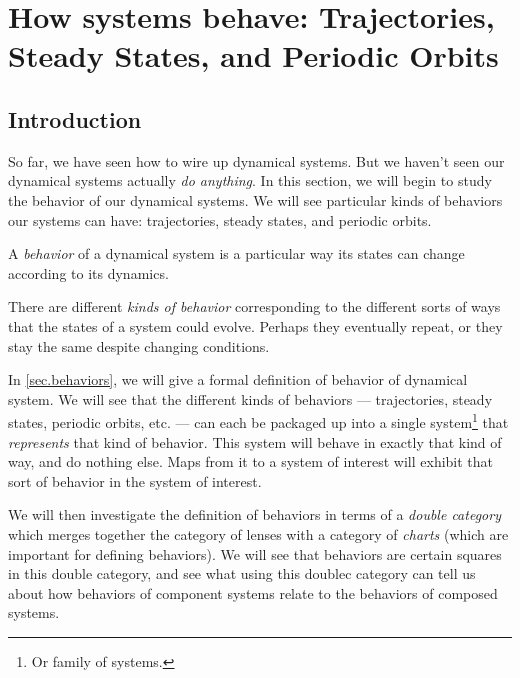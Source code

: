 \documentclass[DynamicalBook]{subfiles}
\begin{document}
%


\setcounter{chapter}{1}%


\chapter{How systems behave: Trajectories, Steady States, and Periodic Orbits}\label{chapter.2}

\section{Introduction}

So far, we have seen how to wire up dynamical systems. But we haven't seen our
dynamical systems actually \emph{do anything}. In this section, we will begin to
study the behavior of our dynamical systems. We will see particular kinds of
behaviors our systems can have:
trajectories, steady states, and periodic orbits.

\begin{informal}
  A \emph{behavior} of a dynamical system is a particular way its states can
  change according to its dynamics.  

  There are different \emph{kinds of behavior} corresponding to the different
  sorts of ways that the states of a system could evolve. Perhaps they eventually
  repeat, or they stay the same despite changing conditions.
\end{informal}

In \cref{sec.behaviors}, we will give a formal definition of behavior of
dynamical system. We will see that the different kinds of behaviors ---
trajectories, steady states, periodic orbits, etc. --- can each
be packaged up into a single system\footnote{Or family of systems.} that \emph{represents} that kind of
behavior. This system will behave in exactly that kind of way, and do nothing else. Maps from it to a system of interest will exhibit that sort of behavior in the system of interest.

We will then investigate the definition of behaviors in terms of a \emph{double
  category} which merges together the category of lenses with a category of
\emph{charts} (which are important for defining behaviors). We will see that
behaviors are certain squares in this double category, and see what using this
doublec category can tell us about how behaviors of component systems relate to
the behaviors of composed systems. 


\end{document}
